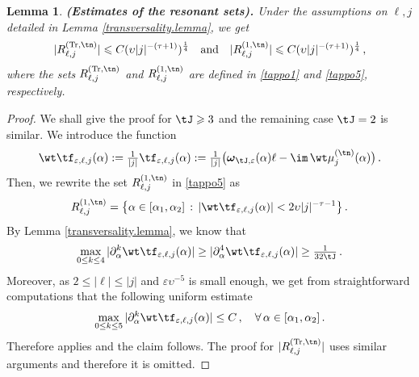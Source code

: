 \documentclass[a4paper,reqno,10pt]{article}
\newtheorem{lem}{Lemma}[section]
\newcommand{\pa}{\partial}
\newcommand{\bomega}{{\boldsymbol{\omega}}}
\begin{document}
\begin{lem}\label{est.Relln}{\bf (Estimates of the resonant sets).} Under the assumptions on $\ell,j$ detailed in Lemma \ref{transversality.lemma}, we get
	\begin{equation}
	|R_{\ell,j}^{({\rm Tr},\tn)}| \leqslant C (\upsilon |j| ^{-(\tau+1)})^{\frac14}\quad\hbox{and}\quad   |R_{\ell,j}^{(1,\tn)}| \leqslant C (\upsilon |j| ^{-(\tau+1)})^{\frac14} \,,
	\end{equation}
	where the sets   $R_{\ell,j}^{({\rm Tr},\tn)}$ and  $R_{\ell,j}^{(1,\tn)}$ are defined in \eqref{tappo1} and \eqref{tappo5}, respectively.
\end{lem}
\begin{proof}
	We shall give the proof for $\tJ\geqslant3$ and the remaining case $\tJ=2$ is similar. We introduce the function
	\begin{equation}
		\wt\tf_{\varepsilon,\ell,j}(\alpha) := \tfrac{1}{|j|} \tf_{\varepsilon,\ell,j}(\alpha) := \tfrac{1}{|j|} \big( \bomega_{\tJ,\varepsilon}(\alpha) \ell -\im \, \wt\mu_{j}^{(\tn)}(\alpha) \big) \,.
	\end{equation}
	Then, we rewrite the set $R_{\ell,j}^{(1,\tn)}$ in \eqref{tappo5} as
	\begin{equation}
		R_{\ell,j}^{(1,\tn)} = \big\{ \alpha\in[\alpha_{1},\alpha_{2}]  \, : \, |\wt\tf_{\varepsilon,\ell,j}(\alpha)| < 2\upsilon |j|^{-\tau-1} \big\} \,.
	\end{equation}
	By Lemma \ref{transversality.lemma}, we know that
	\begin{equation}
		\max_{0\leq k \leq 4} |\pa_{\alpha}^k \wt\tf_{\varepsilon,\ell,j}( \alpha) | \geq  |\pa_{\alpha}^4 \wt\tf_{\varepsilon,\ell,j}( \alpha) |  \geq \tfrac{1}{32 \tJ} \,.
	\end{equation}
	Moreover, as $2\leqslant |\ell|\leqslant |j|$ and $\varepsilon \upsilon^{-5}$ is small enough, we get from straightforward computations that the following uniform estimate 
	$$ 	\max_{0\leq k \leq 5} |\pa_{\alpha}^k \wt\tf_{\varepsilon,\ell,j}( \alpha) |  \leq C\,, \quad \forall \, \alpha\in [\alpha_{1},\alpha_{2}]\,.
    $$
	Therefore  \cite[Theorem 17.1]{Russ}  applies and the claim follows. The proof for $|R_{\ell,j}^{({\rm Tr},\tn)}|$ uses similar arguments and therefore it is omitted.
\end{proof}
\end{document}
